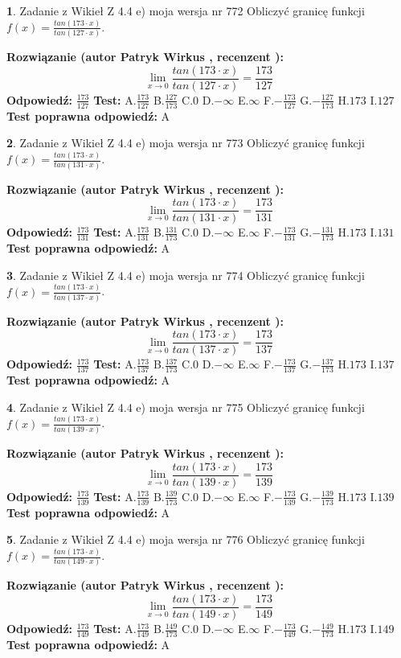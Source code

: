 \documentclass[12pt, a4paper]{article}
\theoremstyle{definition} %
\newtheorem{zad}{}
\newcommand{\zadStart}[1]{\begin{zad}#1\newline}
\newcommand{\zadStop}{\end{zad}}
\newcommand{\rozwStart}[2]{\noindent \textbf{Rozwiązanie (autor #1 , recenzent #2): }\newline}
\newcommand{\rozwStop}{\newline}
\newcommand{\odpStart}{\noindent \textbf{Odpowiedź:}\newline}
\newcommand{\odpStop}{\newline}
\newcommand{\testStart}{\noindent \textbf{Test:}\newline}
\newcommand{\testStop}{\newline}
\newcommand{\kluczStart}{\noindent \textbf{Test poprawna odpowiedź:}\newline}
\newcommand{\kluczStop}{\newline}
\begin{document}
\zadStart{Zadanie z Wikieł Z 4.4 e) moja wersja nr 772}
Obliczyć granicę funkcji $f(x)=\frac{tan(173\cdot x)}{tan(127\cdot x)}$.
\zadStop
\rozwStart{Patryk Wirkus}{}
$$\lim\limits_{x\to 0}\frac{tan(173\cdot x)}{tan(127\cdot x)}=
\frac{173}{127}$$
\rozwStop
\odpStart
$\frac{173}{127}$
\odpStop
\testStart
A.$\frac{173}{127}$
B.$\frac{127}{173}$
C.$0$
D.$-\infty$
E.$\infty$
F.$-\frac{173}{127}$
G.$-\frac{127}{173}$
H.$173$
I.$127$
\testStop
\kluczStart
A
\kluczStop



\zadStart{Zadanie z Wikieł Z 4.4 e) moja wersja nr 773}
Obliczyć granicę funkcji $f(x)=\frac{tan(173\cdot x)}{tan(131\cdot x)}$.
\zadStop
\rozwStart{Patryk Wirkus}{}
$$\lim\limits_{x\to 0}\frac{tan(173\cdot x)}{tan(131\cdot x)}=
\frac{173}{131}$$
\rozwStop
\odpStart
$\frac{173}{131}$
\odpStop
\testStart
A.$\frac{173}{131}$
B.$\frac{131}{173}$
C.$0$
D.$-\infty$
E.$\infty$
F.$-\frac{173}{131}$
G.$-\frac{131}{173}$
H.$173$
I.$131$
\testStop
\kluczStart
A
\kluczStop



\zadStart{Zadanie z Wikieł Z 4.4 e) moja wersja nr 774}
Obliczyć granicę funkcji $f(x)=\frac{tan(173\cdot x)}{tan(137\cdot x)}$.
\zadStop
\rozwStart{Patryk Wirkus}{}
$$\lim\limits_{x\to 0}\frac{tan(173\cdot x)}{tan(137\cdot x)}=
\frac{173}{137}$$
\rozwStop
\odpStart
$\frac{173}{137}$
\odpStop
\testStart
A.$\frac{173}{137}$
B.$\frac{137}{173}$
C.$0$
D.$-\infty$
E.$\infty$
F.$-\frac{173}{137}$
G.$-\frac{137}{173}$
H.$173$
I.$137$
\testStop
\kluczStart
A
\kluczStop



\zadStart{Zadanie z Wikieł Z 4.4 e) moja wersja nr 775}
Obliczyć granicę funkcji $f(x)=\frac{tan(173\cdot x)}{tan(139\cdot x)}$.
\zadStop
\rozwStart{Patryk Wirkus}{}
$$\lim\limits_{x\to 0}\frac{tan(173\cdot x)}{tan(139\cdot x)}=
\frac{173}{139}$$
\rozwStop
\odpStart
$\frac{173}{139}$
\odpStop
\testStart
A.$\frac{173}{139}$
B.$\frac{139}{173}$
C.$0$
D.$-\infty$
E.$\infty$
F.$-\frac{173}{139}$
G.$-\frac{139}{173}$
H.$173$
I.$139$
\testStop
\kluczStart
A
\kluczStop



\zadStart{Zadanie z Wikieł Z 4.4 e) moja wersja nr 776}
Obliczyć granicę funkcji $f(x)=\frac{tan(173\cdot x)}{tan(149\cdot x)}$.
\zadStop
\rozwStart{Patryk Wirkus}{}
$$\lim\limits_{x\to 0}\frac{tan(173\cdot x)}{tan(149\cdot x)}=
\frac{173}{149}$$
\rozwStop
\odpStart
$\frac{173}{149}$
\odpStop
\testStart
A.$\frac{173}{149}$
B.$\frac{149}{173}$
C.$0$
D.$-\infty$
E.$\infty$
F.$-\frac{173}{149}$
G.$-\frac{149}{173}$
H.$173$
I.$149$
\testStop
\kluczStart
A
\kluczStop
\end{document}
